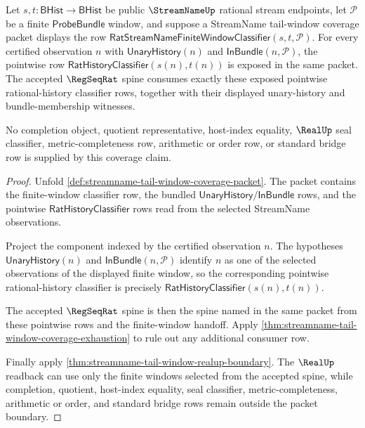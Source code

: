 \begin{theorem}
\label{thm:streamname-regseqrat-finite-window-classifier-coverage}
Let $s,t:\mathsf{BHist}\to\mathsf{BHist}$ be public $\StreamNameUp$
rational stream endpoints, let $\mathcal P$ be a finite
$\mathsf{ProbeBundle}$ window, and suppose a StreamName tail-window coverage
packet displays the row
$\mathsf{RatStreamNameFiniteWindowClassifier}(s,t,\mathcal P)$. For every
certified observation $n$ with $\mathsf{UnaryHistory}(n)$ and
$\mathsf{InBundle}(n,\mathcal P)$, the pointwise row
$\mathsf{RatHistoryClassifier}(s(n),t(n))$ is exposed in the same packet. The
accepted $\RegSeqRat$ spine consumes exactly these exposed pointwise
rational-history classifier rows, together with their displayed unary-history
and bundle-membership witnesses.

No completion object, quotient representative, host-index equality,
$\RealUp$ seal classifier, metric-completeness row, arithmetic or order row,
or standard bridge row is supplied by this coverage claim.
\end{theorem}
\begin{proof}
Unfold \autoref{def:streamname-tail-window-coverage-packet}. The packet
contains the finite-window classifier row, the bundled
$\mathsf{UnaryHistory}/\mathsf{InBundle}$ rows, and the pointwise
$\mathsf{RatHistoryClassifier}$ rows read from the selected StreamName
observations.

Project the component indexed by the certified observation $n$. The hypotheses
$\mathsf{UnaryHistory}(n)$ and $\mathsf{InBundle}(n,\mathcal P)$ identify $n$
as one of the selected observations of the displayed finite window, so the
corresponding pointwise rational-history classifier is precisely
$\mathsf{RatHistoryClassifier}(s(n),t(n))$.

The accepted $\RegSeqRat$ spine is then the spine named in the same packet from
these pointwise rows and the finite-window handoff. Apply
\autoref{thm:streamname-tail-window-coverage-exhaustion} to rule out any
additional consumer row.

Finally apply \autoref{thm:streamname-tail-window-realup-boundary}. The
$\RealUp$ readback can use only the finite windows selected from the accepted
spine, while completion, quotient, host-index equality, seal classifier,
metric-completeness, arithmetic or order, and standard bridge rows remain
outside the packet boundary.
\end{proof}

